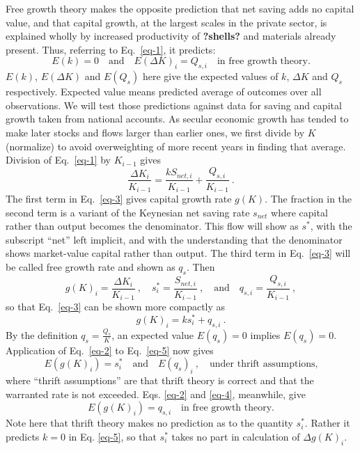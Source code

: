 \documentclass[a4paper,fleqn]{latex_styles/cas-sc}
\begin{document}
Free growth theory makes the opposite prediction that net saving adds no capital value, and that capital growth, at the largest scales in the private sector, is explained wholly by increased productivity of \textbf{?shells?} and materials already present. Thus, referring to Eq.~\eqref{eq-1}, it predicts:
%
\begin{equation}
    E(k) = 0 \quad \text{and} \quad E(\Delta K)_i = Q_{s,i} \quad \text{in free growth theory.} \label{eq-3}
\end{equation}
%
\(E(k)\), \(E(\Delta K)\) and \(E(Q_{s})\) here give the expected values of \(k\), \(\Delta K\)
and \(Q_{s}\) respectively. Expected value means predicted average of outcomes
over all observations.
We will test those predictions against data for saving and capital growth taken from national accounts.
As secular economic growth has tended to make
later stocks and flows larger than earlier ones, we first divide by
\(K\) (normalize) to avoid overweighting of more recent years in finding
that average. Division of Eq.~\eqref{eq-1} by \(K_{i - 1}\) gives
%
\begin{equation}
    \frac{{\Delta K}_{i}}{K_{i - 1}} = \frac{k S_{net,i}}{K_{i - 1}} + \frac{Q_{s,i}}{K_{i - 1}} \ .\label{eq-4}
\end{equation}
%
The first term in Eq.~\eqref{eq-3} gives capital growth rate \(g(K)\). The fraction in the second term is a
variant of the Keynesian net saving rate \(s_{net}\) where capital
rather than output becomes the denominator. This flow will show 
as \(s^{*}\), with the subscript ``net''
left implicit, and with the understanding that the denominator shows
market-value capital rather than output.
The third term in Eq.~\eqref{eq-3} will be called free growth rate and
shown as \(q_s\). Then
%
\[g{(K)}_{i} = \frac{\Delta K_{i}}{K_{i - 1}} \ , \quad
s^{*}_{i} = \frac{S_{net,i}}{K_{i - 1}} \ , \quad \text{and} \quad
q_{s,i} = \frac{Q_{s,i}}{K_{i - 1}} \ ,\]
%
so that Eq.~\eqref{eq-3} can be shown more compactly as
%
\begin{equation}
g(K)_{i} = k s^{*}_{i} + q_{s,i} \ .\label{eq-5}
\end{equation}
%
By the definition \(q_s = \frac{Q_{s}}{K}\), an expected value \(E(q_s) = 0\)
implies \(E\left( q_s\right) = 0\). Application of Eq.~\eqref{eq-2} to
Eq.~\eqref{eq-5} now gives
%
\begin{equation}
    E(g(K)_i) = s^*_i \quad \text{and} \quad E(q_s)_i\ , \quad \text{under thrift assumptions,}\label{eq-6}
\end{equation}
%
where ``thrift assumptions'' are that thrift theory is correct and that
the warranted rate is not exceeded. Eqs. \eqref{eq-2} and \eqref{eq-4}, meanwhile, give
%
\begin{equation}
    E(g(K)_i) = q_{s,i} \quad \text{in free growth theory.}\label{eq-7}
\end{equation}
%
Note here that thrift theory makes no prediction as to the quantity \(s^*_i\). Rather it predicts \(k=0\) in Eq. \eqref{eq-5}, so that \(s^*_i\) takes no part in calculation of \(\Delta g(K)_i\).
\end{document}
